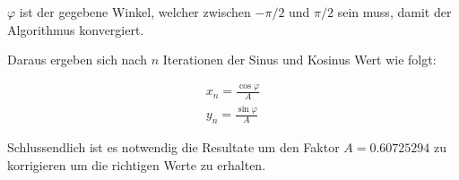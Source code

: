 \(\varphi\) ist der gegebene Winkel, welcher zwischen \(-\pi/2\) und \(\pi/2\) sein muss, damit der Algorithmus konvergiert.

Daraus ergeben sich nach \(n\) Iterationen der Sinus und Kosinus Wert wie folgt:

\begin{equation}
\begin{aligned}
x_n = \frac{\cos{\varphi}}{A} \\
y_n = \frac{\sin{\varphi}}{A}
\end{aligned}
\label{equ:cordic_3}
\end{equation} 

Schlussendlich ist es notwendig die Resultate um den Faktor \(A = 0.60725294\) zu korrigieren um die richtigen Werte zu erhalten.

